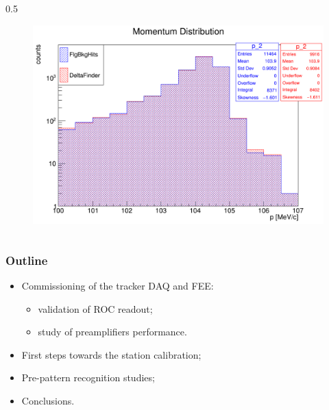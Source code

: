 \documentclass{beamer}
\begin{document}
\begin{frame}
\begin{columns}
\begin{column}{0.5\framewidth}
\begin{figure}[!h]
        \includegraphics[width =0.9\columnwidth]{figures/png/Screenshot_20240820_160904.png}
       \label{fig:momhits}
\end{figure}
        \end{column}
    \end{columns}
     
\end{frame}







\begin{frame}
    \frametitle{Outline}
    
\begin{itemize}
\item \textcolor{mygray}{Commissioning of the tracker DAQ and FEE:}
\begin{itemize}
         \vspace{2mm}

    \item \textcolor{mygray}{validation of ROC readout;}
             \vspace{1.5mm}

    \item \textcolor{mygray}{study of preamplifiers performance}.
\end{itemize}
\vspace{4mm}
    \item \textcolor{mygray}{First steps towards the station calibration;}
    \vspace{6mm}

    \item \textcolor{mygray}{Pre-pattern recognition studies;}
  \vspace{6mm}
    \item Conclusions.
\end{itemize}
\end{frame}
\end{document}
